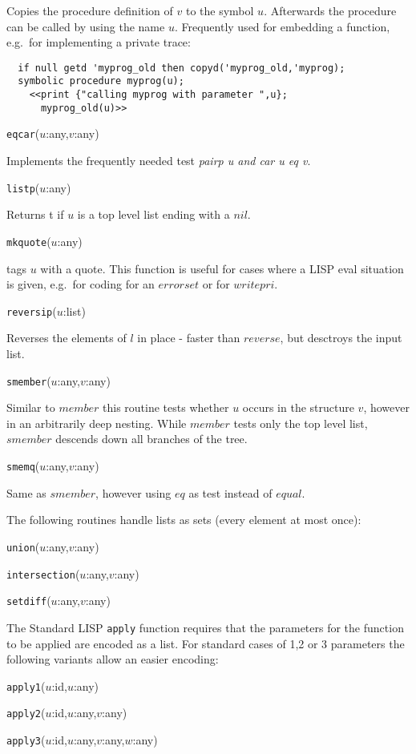 \documentclass[11pt]{article}
\begin{document}
\noindent
Copies the procedure definition of $v$ to the symbol $u$. Afterwards
the procedure can be called by using the name $u$.  Frequently
used for embedding a function, e.g.\  for implementing a private
trace:
\begin{verbatim}
  if null getd 'myprog_old then copyd('myprog_old,'myprog);
  symbolic procedure myprog(u);
    <<print {"calling myprog with parameter ",u};
      myprog_old(u)>>
\end{verbatim}

\vspace{5mm}    
{\tt eqcar}($u$:any,$v$:any)

\noindent
Implements the frequently needed test {\em pairp u and car u eq v}.

\vspace{5mm}    
{\tt listp}($u$:any)

\noindent
Returns t if $u$ is a top level list ending with a $nil$.

\vspace{5mm}    
{\tt mkquote}($u$:any)

\noindent
tags $u$ with a quote. This function is useful for cases where
a LISP eval situation is given, e.g.\   for coding for an $errorset$
or for $writepri$.

\vspace{5mm}    
{\tt reversip}($u$:list)

\noindent
Reverses the elements of $l$ in place - faster than $reverse$, but
desctroys the input list.

\vspace{5mm}    
{\tt smember}($u$:any,$v$:any)

\noindent
Similar to $member$ this routine tests whether $u$ occurs in
the structure $v$, however in an arbitrarily deep nesting.
While $member$ tests only the top level
list, $smember$ descends down all branches of the tree.

\vspace{5mm}    
{\tt smemq}($u$:any,$v$:any)

\noindent
Same as $smember$, however using $eq$ as test instead of $equal$.

\vspace{5mm}    
\noindent
The following routines handle lists as sets (every element
at most once):

{\tt union}($u$:any,$v$:any)

{\tt intersection}($u$:any,$v$:any)

{\tt setdiff}($u$:any,$v$:any)  %

\vspace{5mm}
\noindent
The Standard LISP {\tt apply} function requires that the parameters
for the function to be applied are encoded as a list. For standard
cases of 1,2 or 3 parameters the following variants allow an easier 
encoding:

{\tt apply1}($u$:id,$u$:any)

{\tt apply2}($u$:id,$u$:any,$v$:any)

{\tt apply3}($u$:id,$u$:any,$v$:any,$w$:any)
\printindex
\end{document}
